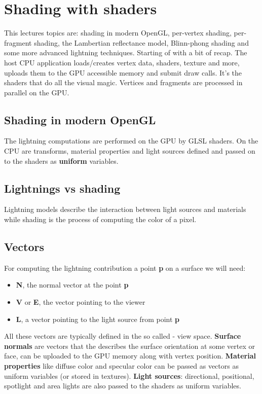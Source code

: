 \section{Shading with shaders}
This lectures topics are: shading in modern OpenGL, per-vertex shading, per-fragment shading, the Lambertian reflectance model, Blinn-phong shading and some more advanced lightning techniques.
Starting of with a bit of recap. The host CPU application loads/creates vertex data, shaders, texture and more, uploads them to the GPU accessible memory and submit draw calls. It's the shaders that do all the visual magic. Vertices and fragments are processed in parallel on the GPU.


	\subsection*{Shading in modern OpenGL}
	The lightning computations are performed on the GPU by GLSL shaders. On the CPU are transforms, material properties and light sources defined and passed on to the shaders as \textbf{uniform} variables. 

	\subsection*{Lightnings vs shading}
	Lightning models describe the interaction between light sources and materials while shading is the process of computing the color of a pixel. 

	\subsection*{Vectors}
	For computing the lightning contribution a point \textbf{p} on a surface we will need: 
	\begin{itemize}
		\item \textbf{N}, the normal vector at the point \textbf{p}
		\item \textbf{V} or \textbf{E}, the vector pointing to the viewer
		\item \textbf{L}, a vector pointing to the light source from point \textbf{p}
	\end{itemize}
	All these vectors are typically defined in the so called - view space. \textbf{Surface normals} are vectors that the describes the surface orientation at some vertex or face, can be uploaded to the GPU memory along with vertex position. \textbf{Material properties} like diffuse color and specular color can be passed as vectors as uniform variables (or stored in textures). \textbf{Light sources}: directional, positional, spotlight and area lights are also passed to the shaders as uniform variables. 

